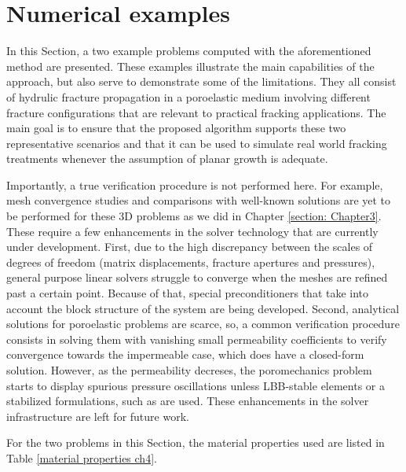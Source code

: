 \section{Numerical examples}
\label{section: Chapter4/examples}

In this Section, a two example problems computed with the aforementioned method are presented. These examples illustrate the main capabilities of the approach, but also serve to demonstrate some of the limitations. They all consist of hydrulic fracture propagation in a poroelastic medium involving different fracture configurations that are relevant to practical fracking applications. The main goal is to ensure that the proposed algorithm supports these two representative scenarios and that it can be used to simulate real world fracking treatments whenever the assumption of planar growth is adequate. 

Importantly, a true verification procedure is not performed here. For example, mesh convergence studies and comparisons with well-known solutions are yet to be performed for these 3D problems as we did in Chapter \ref{section: Chapter3}. These require a few enhancements in the solver technology that are currently under development. First, due to the high discrepancy between the scales of degrees of freedom (matrix displacements, fracture apertures and pressures), general purpose linear solvers struggle to converge when the meshes are refined past a certain point. Because of that, special preconditioners that take into account the block structure of the system are being developed. Second, analytical solutions for poroelastic problems are scarce, so, a common verification procedure consists in solving them with vanishing small permeability coefficients to verify convergence towards the impermeable case, which does have a closed-form solution. However, as the permeability decreses, the poromechanics problem starts to display spurious pressure oscillations unless LBB-stable elements \cite{arnold1984stable} or a stabilized formulations, such as \cite{white2008stabilized} are used. These enhancements in the solver infrastructure are left for future work.

For the two problems in this Section, the material properties used are listed in Table \ref{material properties ch4}. 


